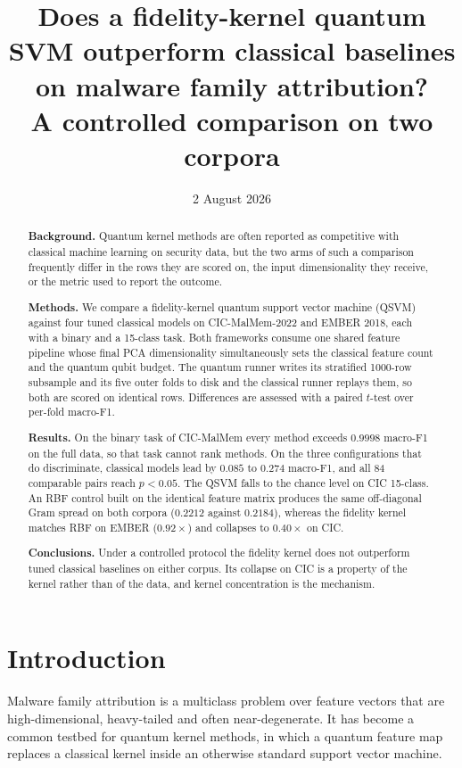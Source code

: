 \documentclass[11pt]{article}
\title{Does a fidelity-kernel quantum SVM outperform classical baselines\\
on malware family attribution?\\[0.3em]
\large A controlled comparison on two corpora}
\date{2 August 2026}
\begin{document}
\maketitle

\begin{abstract}
\noindent
\textbf{Background.} Quantum kernel methods are often reported as competitive
with classical machine learning on security data, but the two arms of such a
comparison frequently differ in the rows they are scored on, the input
dimensionality they receive, or the metric used to report the outcome.

\noindent
\textbf{Methods.} We compare a fidelity-kernel quantum support vector machine
(QSVM) against four tuned classical models on CIC-MalMem-2022 and EMBER 2018,
each with a binary and a 15-class task. Both frameworks consume one shared
feature pipeline whose final PCA dimensionality simultaneously sets the classical
feature count and the quantum qubit budget. The quantum runner writes its
stratified 1000-row subsample and its five outer folds to disk and the classical
runner replays them, so both are scored on identical rows. Differences are
assessed with a paired $t$-test over per-fold macro-F1.

\noindent
\textbf{Results.} On the binary task of CIC-MalMem every method exceeds
$0.9998$ macro-F1 on the full data, so that task cannot rank methods. On the
three configurations that do discriminate, classical models lead by $0.085$ to
$0.274$ macro-F1, and all 84 comparable pairs reach $p<0.05$. The QSVM falls to
the chance level on CIC 15-class. An RBF control built on the identical feature
matrix produces the same off-diagonal Gram spread on both corpora ($0.2212$
against $0.2184$), whereas the fidelity kernel matches RBF on EMBER
($0.92\times$) and collapses to $0.40\times$ on CIC.

\noindent
\textbf{Conclusions.} Under a controlled protocol the fidelity kernel does not
outperform tuned classical baselines on either corpus. Its collapse on CIC is a
property of the kernel rather than of the data, and kernel concentration is the
mechanism.
\end{abstract}

\section{Introduction}

Malware family attribution is a multiclass problem over feature vectors that are
high-dimensional, heavy-tailed and often near-degenerate. It has become a common
testbed for quantum kernel methods, in which a quantum feature map replaces a
classical kernel inside an otherwise standard support vector machine.
\end{document}
